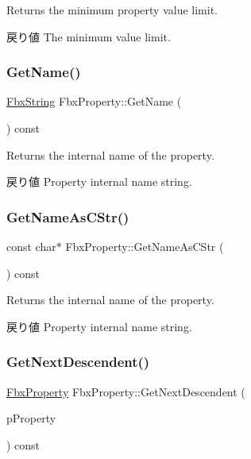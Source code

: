 Returns the minimum property value limit. \begin{DoxyReturn}{戻り値}
The minimum value limit. 
\end{DoxyReturn}
\mbox{\label{class_fbx_property_ad4505c67d892b22bb40ba5e9c5b4a844}} 
\subsubsection{\texorpdfstring{Get\+Name()}{GetName()}}
{\footnotesize\ttfamily \hyperlink{class_fbx_string}{Fbx\+String} Fbx\+Property\+::\+Get\+Name (\begin{DoxyParamCaption}{ }\end{DoxyParamCaption}) const}

Returns the internal name of the property. \begin{DoxyReturn}{戻り値}
Property internal name string. 
\end{DoxyReturn}
\mbox{\label{class_fbx_property_af2f3725b832d70596008f895950c2235}} 
\subsubsection{\texorpdfstring{Get\+Name\+As\+C\+Str()}{GetNameAsCStr()}}
{\footnotesize\ttfamily const char$\ast$ Fbx\+Property\+::\+Get\+Name\+As\+C\+Str (\begin{DoxyParamCaption}{ }\end{DoxyParamCaption}) const}

Returns the internal name of the property. \begin{DoxyReturn}{戻り値}
Property internal name string. 
\end{DoxyReturn}
\mbox{\label{class_fbx_property_a1de724032949fd7a7b21028894adbcce}} 
\subsubsection{\texorpdfstring{Get\+Next\+Descendent()}{GetNextDescendent()}}
{\footnotesize\ttfamily \hyperlink{class_fbx_property}{Fbx\+Property} Fbx\+Property\+::\+Get\+Next\+Descendent (\begin{DoxyParamCaption}\item[{const \hyperlink{class_fbx_property}{Fbx\+Property} \&}]{p\+Property }\end{DoxyParamCaption}) const\hspace{0.3cm}{\ttfamily [inline]}}

